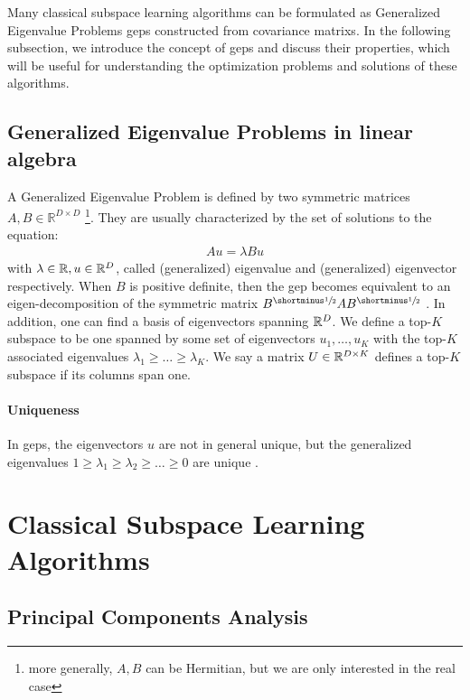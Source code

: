 Many classical subspace learning algorithms can be formulated as Generalized Eigenvalue Problems \acrshort{gep}s constructed from \glspl{covariance matrix}. In the following subsection, we introduce the concept of \acrshort{gep}s and discuss their properties, which will be useful for understanding the optimization problems and solutions of these algorithms.

\subsection{Generalized Eigenvalue Problems in linear algebra}\label{sec:generalized-eigenvalue-problems-in-linear-algebra}
A Generalized Eigenvalue Problem is defined by two symmetric matrices $A,B\in \mathbb{R}^{D\times D}$ \citep{stewart_matrix_1990}\footnote{more generally, $A,B$ can be Hermitian, but we are only interested in the real case}.
They are usually characterized by the set of solutions to the equation:
\begin{align}
    \label{eq:igep}
    Au=\lambda Bu
\end{align}
with $\lambda \in \mathbb{R}, u \in \mathbb{R}^D$, called (generalized) eigenvalue and (generalized) eigenvector respectively.
When $B$ is positive definite, then the \acrshort{gep} becomes equivalent to an eigen-decomposition of the symmetric matrix $B^\mhalf A B^\mhalf$ \citep{ghojogh2019eigenvalue}.
In addition, one can find a basis of eigenvectors spanning $\mathbb{R}^D$.
We define a top-$K$ subspace to be one spanned by some set of eigenvectors {$u_1,\dots,u_K$} with the top-$K$ associated eigenvalues $\lambda_1 \geq \dots \geq \lambda_K$.
We say a matrix $U \in \mathbb{R}^{D \times K}$ defines a top-$K$ subspace if its columns span one.

\paragraph{Uniqueness}
In \acrshort{gep}s, the eigenvectors $u$ are not in general unique, but the generalized eigenvalues $1 \geq \lambda_1 \geq \lambda_2 \geq \dots \geq 0$ are unique \citep{mills1988calculation}.

\section{Classical Subspace Learning Algorithms}\label{sec:classical-subspace-learning-algorithms}

\subsection{Principal Components Analysis}

